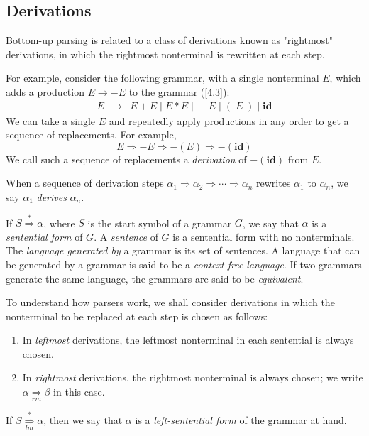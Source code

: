 \documentclass[a4paper,twoside]{book}
\begin{document}
\subsection{Derivations}

Bottom-up parsing is related to a class of derivations known as "rightmost" derivations, in which the rightmost nonterminal is rewritten at each step.

For example, consider the following grammar, with a single nonterminal $E$, which adds a production $E\to-E$ to the grammar (\ref{4.3}):
\begin{equation}
    \begin{array}{ccc}E&\rightarrow&E+E\;|\;E*E\;|\;-E\;|\;(\;E\;)\;|\;\textbf{id}\end{array}
    \label{4.7}
\end{equation}
We can take a single $E$ and repeatedly apply productions in any order to get a sequence of replacements. For example, $$E\Rightarrow-E\Rightarrow-(E)\Rightarrow-(\textbf{id})$$ We call such a sequence of replacements a \textit{derivation} of $-(\textbf{id})$ from $E$.

When a sequence of derivation steps $\alpha_1\Rightarrow\alpha_2\Rightarrow\cdots\Rightarrow\alpha_n$ rewrites $\alpha_1$ to $\alpha_n$, we say $\alpha_1$ \textit{derives} $\alpha_n$.

If $S\overset{*}{\Rightarrow}\alpha$, where $S$ is the start symbol of a grammar $G$, we say that $\alpha$ is a \textit{sentential form} of $G$. A \textit{sentence} of $G$ is a sentential form with no nonterminals. The \textit{language generated by} a grammar is its set of sentences. A language that can be generated by a grammar is said to be a \textit{context-free language}. If two grammars generate the same language, the grammars are said to be \textit{equivalent}.

To understand how parsers work, we shall consider derivations in which the nonterminal to be replaced at each step is chosen as follows:
\begin{enumerate}
    \item In \textit{leftmost} derivations, the leftmost nonterminal in each sentential is always chosen.
    \item In \textit{rightmost} derivations, the rightmost nonterminal is always chosen; we write $\alpha\underset{rm}{\Rightarrow}\beta$ in this case.
\end{enumerate}

If $S\overset{*}{\underset{lm}{\Rightarrow}}\alpha$, then we say that $\alpha$ is a \textit{left-sentential form} of the grammar at hand.
\end{document}
